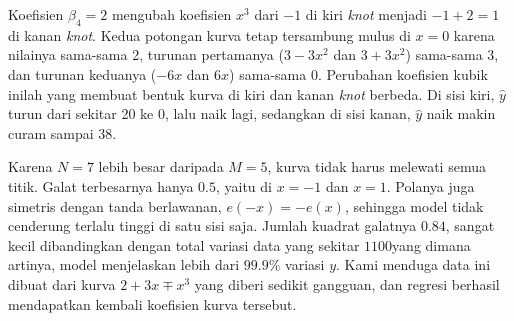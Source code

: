 Koefisien $\beta_4 = 2$ mengubah koefisien $x^3$ dari $-1$ di kiri \textit{knot} menjadi $-1 + 2 = 1$ di kanan \textit{knot}. Kedua potongan kurva tetap tersambung mulus di $x = 0$ karena nilainya sama-sama 2, turunan pertamanya ($3 - 3x^2$ dan $3 + 3x^2$) sama-sama 3, dan turunan keduanya ($-6x$ dan $6x$) sama-sama 0. Perubahan koefisien kubik inilah yang membuat bentuk kurva di kiri dan kanan \textit{knot} berbeda. Di sisi kiri, $\hat y$ turun dari sekitar 20 ke 0, lalu naik lagi, sedangkan di sisi kanan, $\hat y$ naik makin curam sampai 38.

Karena $N = 7$ lebih besar daripada $M = 5$, kurva tidak harus melewati semua titik. Galat terbesarnya hanya $0.5$, yaitu di $x = -1$ dan $x = 1$. Polanya juga simetris dengan tanda berlawanan, $e(-x) = -e(x)$, sehingga model tidak cenderung terlalu tinggi di satu sisi saja. Jumlah kuadrat galatnya $0.84$, sangat kecil dibandingkan dengan total variasi data yang sekitar $1100$yang dimana artinya, model menjelaskan lebih dari $99.9\%$ variasi $y$. Kami menduga data ini dibuat dari kurva $2 + 3x \mp x^3$ yang diberi sedikit gangguan, dan regresi berhasil mendapatkan kembali koefisien kurva tersebut.
